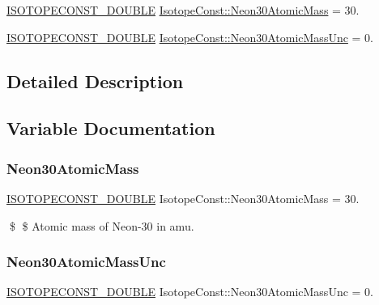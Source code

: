 \begin{DoxyCompactItemize}
\item 
\mbox{\hyperlink{group___isotope_const-_macros_ga8f45a7272ce02c0b4c65c44636ed719a}{I\+S\+O\+T\+O\+P\+E\+C\+O\+N\+S\+T\+\_\+\+D\+O\+U\+B\+LE}} \mbox{\hyperlink{group___isotope_const-_neon-_ne30_gade5c060e43fd9e860b1f24991422cfac}{Isotope\+Const\+::\+Neon30\+Atomic\+Mass}} = 30.
\item 
\mbox{\hyperlink{group___isotope_const-_macros_ga8f45a7272ce02c0b4c65c44636ed719a}{I\+S\+O\+T\+O\+P\+E\+C\+O\+N\+S\+T\+\_\+\+D\+O\+U\+B\+LE}} \mbox{\hyperlink{group___isotope_const-_neon-_ne30_ga35bc8187fecc625366547a73ce15a57d}{Isotope\+Const\+::\+Neon30\+Atomic\+Mass\+Unc}} = 0.
\end{DoxyCompactItemize}


\subsection{Detailed Description}


\subsection{Variable Documentation}
\mbox{\label{group___isotope_const-_neon-_ne30_gade5c060e43fd9e860b1f24991422cfac}} 
\subsubsection{\texorpdfstring{Neon30\+Atomic\+Mass}{Neon30AtomicMass}}
{\footnotesize\ttfamily \mbox{\hyperlink{group___isotope_const-_macros_ga8f45a7272ce02c0b4c65c44636ed719a}{I\+S\+O\+T\+O\+P\+E\+C\+O\+N\+S\+T\+\_\+\+D\+O\+U\+B\+LE}} Isotope\+Const\+::\+Neon30\+Atomic\+Mass = 30.}

\$ \$ Atomic mass of Neon-\/30 in amu. \mbox{\label{group___isotope_const-_neon-_ne30_ga35bc8187fecc625366547a73ce15a57d}} 
\subsubsection{\texorpdfstring{Neon30\+Atomic\+Mass\+Unc}{Neon30AtomicMassUnc}}
{\footnotesize\ttfamily \mbox{\hyperlink{group___isotope_const-_macros_ga8f45a7272ce02c0b4c65c44636ed719a}{I\+S\+O\+T\+O\+P\+E\+C\+O\+N\+S\+T\+\_\+\+D\+O\+U\+B\+LE}} Isotope\+Const\+::\+Neon30\+Atomic\+Mass\+Unc = 0.}


